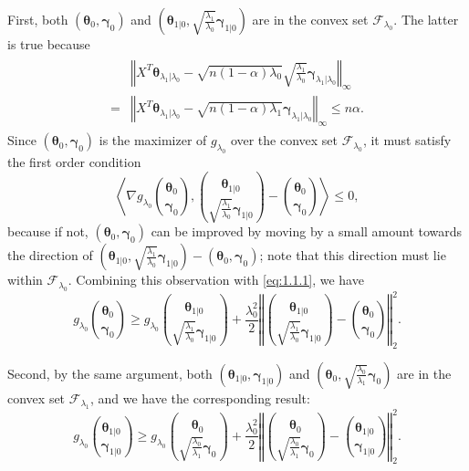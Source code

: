 First, both $(\boldsymbol\theta_{0},\boldsymbol\gamma_{0})$ and $\left(\boldsymbol\theta_{1|0},\sqrt{\frac{\lambda_1}{\lambda_0}}\boldsymbol\gamma_{1|0}\right)$ are in the convex set $\mathcal{F}_{\lambda_0}$. The latter is true because
\begin{gather}
    \begin{aligned}
        &\left\Vert X^T\boldsymbol\theta_{\lambda_1|\lambda_0}-\sqrt{n(1-\alpha)\lambda_0}\sqrt{\frac{\lambda_1}{\lambda_0}}\boldsymbol\gamma_{\lambda_1|\lambda_0}\right\Vert_\infty\\
        = &\left\Vert X^T\boldsymbol\theta_{\lambda_1|\lambda_0}-\sqrt{n(1-\alpha)\lambda_1}\boldsymbol\gamma_{\lambda_1|\lambda_0}\right\Vert_\infty\leq n\alpha.
    \end{aligned}
\end{gather}
Since $(\boldsymbol\theta_{0},\boldsymbol\gamma_{0})$ is the maximizer of $g_{\lambda_0}$ over the convex set $\mathcal{F}_{\lambda_0}$, it must satisfy the first order condition
\begin{equation}
    \label{eq:1.1.2}
    \left\langle\nabla g_{\lambda_0}\binom{\boldsymbol\theta_{0}}{\boldsymbol\gamma_{0}},\binom{\boldsymbol\theta_{1|0}}{\sqrt{\frac{\lambda_1}{\lambda_0}}\boldsymbol\gamma_{1|0}}-\binom{\boldsymbol\theta_{0}}{\boldsymbol\gamma_{0}}\right\rangle\leq 0,
\end{equation}
because if not, $(\boldsymbol\theta_{0},\boldsymbol\gamma_{0})$ can be improved by moving by a small amount towards the direction of $\left(\boldsymbol\theta_{1|0},\sqrt{\frac{\lambda_1}{\lambda_0}}\boldsymbol\gamma_{1|0}\right)-(\boldsymbol\theta_{0},\boldsymbol\gamma_{0})$; note that this direction must lie within $\mathcal{F}_{\lambda_0}$. Combining this observation with \eqref{eq:1.1.1}, we have
\begin{equation}
    \label{eq:1.1.3}
    g_{\lambda_0}\binom{\boldsymbol\theta_{0}}{\boldsymbol\gamma_{0}}\geq g_{\lambda_0}\binom{\boldsymbol\theta_{1|0}}{\sqrt{\frac{\lambda_1}{\lambda_0}}\boldsymbol\gamma_{1|0}}+\frac{\lambda_0^2}{2}\left\Vert\binom{\boldsymbol\theta_{1|0}}{\sqrt{\frac{\lambda_1}{\lambda_0}}\boldsymbol\gamma_{1|0}}-\binom{\boldsymbol\theta_{0}}{\boldsymbol\gamma_{0}}\right\Vert_2^2.
\end{equation}

Second, by the same argument, both $(\boldsymbol\theta_{1|0},\boldsymbol\gamma_{1|0})$ and $\left(\boldsymbol\theta_{0},\sqrt{\frac{\lambda_0}{\lambda_1}}\boldsymbol\gamma_{0}\right)$ are in the convex set $\mathcal{F}_{\lambda_1}$, and we have the corresponding result:
\begin{equation}
    \label{eq:1.1.4}
    g_{\lambda_0}\binom{\boldsymbol\theta_{1|0}}{\boldsymbol\gamma_{1|0}}\geq g_{\lambda_0}\binom{\boldsymbol\theta_{0}}{\sqrt{\frac{\lambda_0}{\lambda_1}}\boldsymbol\gamma_{0}}+\frac{\lambda_0^2}{2}\left\Vert\binom{\boldsymbol\theta_{0}}{\sqrt{\frac{\lambda_0}{\lambda_1}}\boldsymbol\gamma_{0}}-\binom{\boldsymbol\theta_{1|0}}{\boldsymbol\gamma_{1|0}}\right\Vert_2^2.
\end{equation}

